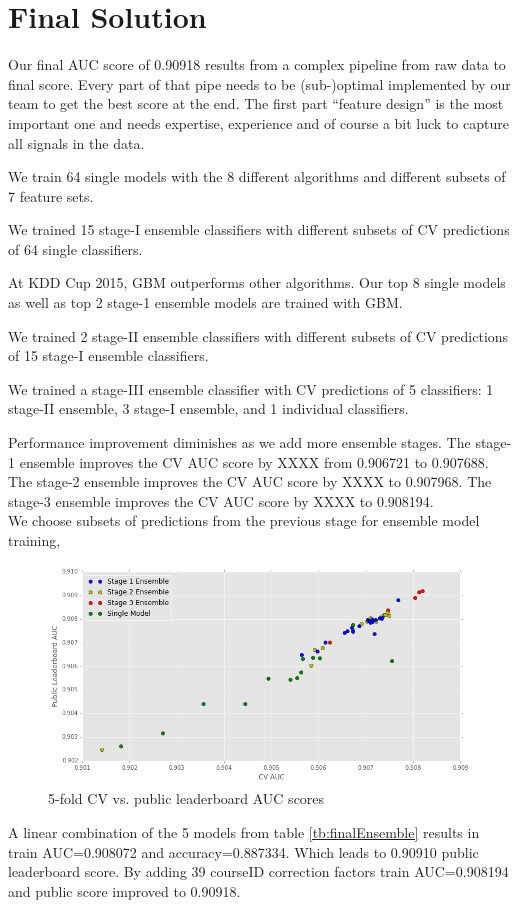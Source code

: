 \section{Final Solution}
Our final AUC score of 0.90918 results from a complex pipeline from raw data to final score.
Every part of that pipe needs to be (sub-)optimal implemented by our team to get the best score at the end.
The first part ``feature design'' is the most important one and needs expertise, experience and of course a bit luck to capture all signals in the data.

We train 64 single models with the 8 different algorithms and different subsets of 7 feature sets.

We trained 15 stage-I ensemble classifiers with different subsets of CV predictions of 64 single classifiers.

At KDD Cup 2015, GBM outperforms other algorithms.  Our top 8 single models as well as top 2 stage-1 ensemble models are trained with GBM.

We trained 2 stage-II ensemble classifiers with different subsets of CV predictions of 15 stage-I ensemble classifiers.

We trained a stage-III ensemble classifier with CV predictions of 5 classifiers: 1 stage-II ensemble, 3 stage-I ensemble, and 1 individual classifiers.

Performance improvement diminishes as we add more ensemble stages.  The stage-1 ensemble improves the CV AUC score by XXXX from 0.906721 to 0.907688.  The stage-2 ensemble improves the CV AUC score by XXXX to 0.907968.  The stage-3 ensemble improves the CV AUC score by XXXX to 0.908194.\\

We choose subsets of predictions from the previous stage for ensemble model training, 
\begin{figure}[t]
  \caption{5-fold CV vs. public leaderboard AUC scores}
  \centering
    \includegraphics[width=0.5 \textwidth]{cv_lb}
\end{figure}

A linear combination of the 5 models from table \ref{tb:finalEnsemble} results in train AUC=0.908072 and accuracy=0.887334.
Which leads to 0.90910 public leaderboard score.
By adding 39 courseID correction factors train AUC=0.908194 and public score improved to 0.90918.

